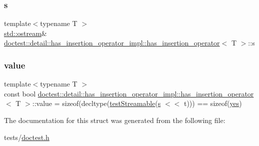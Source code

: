 \subsubsection{\texorpdfstring{s}{s}}
{\footnotesize\ttfamily template$<$typename T $>$ \\
\hyperlink{doctest_8h_a116af65cb5e924b33ad9d9ecd7a783f3}{std\+::ostream}\& \hyperlink{structdoctest_1_1detail_1_1has__insertion__operator__impl_1_1has__insertion__operator}{doctest\+::detail\+::has\+\_\+insertion\+\_\+operator\+\_\+impl\+::has\+\_\+insertion\+\_\+operator}$<$ T $>$\+::s\hspace{0.3cm}{\ttfamily [static]}}

\mbox{\label{structdoctest_1_1detail_1_1has__insertion__operator__impl_1_1has__insertion__operator_a8e8e9abdead07386f3d1f16bbca64986}} 
\subsubsection{\texorpdfstring{value}{value}}
{\footnotesize\ttfamily template$<$typename T $>$ \\
const bool \hyperlink{structdoctest_1_1detail_1_1has__insertion__operator__impl_1_1has__insertion__operator}{doctest\+::detail\+::has\+\_\+insertion\+\_\+operator\+\_\+impl\+::has\+\_\+insertion\+\_\+operator}$<$ T $>$\+::value = sizeof(decltype(\hyperlink{namespacedoctest_1_1detail_1_1has__insertion__operator__impl_a0d220c1c0845fcc4952ed6d45ac254aa}{test\+Streamable}(\hyperlink{structdoctest_1_1detail_1_1has__insertion__operator__impl_1_1has__insertion__operator_abdd586daed17058bb6d08adc796802f0}{s} $<$$<$ t))) == sizeof(\hyperlink{namespacedoctest_1_1detail_1_1has__insertion__operator__impl_a0351593f27f12bf077fd702f6fc26fb5}{yes})\hspace{0.3cm}{\ttfamily [static]}}



The documentation for this struct was generated from the following file\+:\begin{DoxyCompactItemize}
\item 
tests/\hyperlink{doctest_8h}{doctest.\+h}\end{DoxyCompactItemize}
